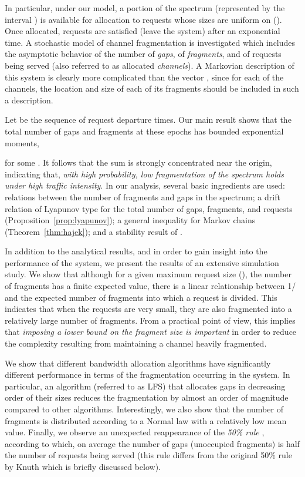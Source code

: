 \documentclass{amsart}
\begin{document}
In particular, under our model, a portion  of the  spectrum (represented by the interval  ) is
available  for  allocation to  requests whose  sizes are uniform on   ().  Once  allocated, requests are satisfied (leave the system) after an  exponential time. A stochastic model  of channel fragmentation
is investigated which includes the asymptotic
behavior of the number   of \emph{gaps},  of  \emph{fragments}, and  of requests being served (also referred to as allocated \emph{channels}). A
Markovian description of  this system is clearly more complicated  than the vector , since for  each of  the   channels, the  location and  size of  each  of its
fragments should be included in such a description.

Let  be the  sequence of  request departure times. Our main result shows that the total  number of gaps and fragments
at these epochs has bounded exponential moments,

for some . It follows that the sum  is strongly concentrated near the origin,
indicating that, \emph{with high probability, low fragmentation of the spectrum holds under high traffic intensity}.
In our  analysis, several basic ingredients  are used: relations between  the number of
fragments and gaps in the spectrum; a drift relation of Lyapunov type for
the total number of gaps, fragments, and requests (Proposition~\ref{prop:lyapunov});
a general inequality for Markov chains (Theorem~\ref{thm:hajek});
and a  stability result of \cite{KipnisR1990}.

In addition to the analytical results, and in order to gain insight into the performance of the system, we present the results of an extensive simulation study. We show that although for a given maximum request size (), the number of fragments has a finite expected value, there is a linear relationship between 1/ and the expected number of fragments into which a request is divided. This indicates that when the requests are very small, they are also fragmented into a relatively large number of fragments. From a practical point of view, this implies that \emph{imposing a lower bound on the fragment size is important} in order to reduce the complexity resulting from maintaining a channel heavily fragmented.

We show that different bandwidth allocation algorithms have significantly different performance in terms of the fragmentation occurring in the system. In particular, an algorithm (referred to as LFS) that allocates gaps in decreasing order of their sizes reduces the fragmentation by almost an order of magnitude compared to other algorithms. Interestingly, we also
show that the number of fragments is distributed according to a
Normal law with a relatively low mean value. Finally, we observe an
unexpected reappearance of the {\em 50\% rule} \cite{Knuth1997},
according to which, on average the number of gaps (unoccupied
fragments) is half the number of requests being served (this
rule differs from the original 50\% rule by Knuth
\cite{Knuth1997} which is briefly discussed below).
\end{document}
